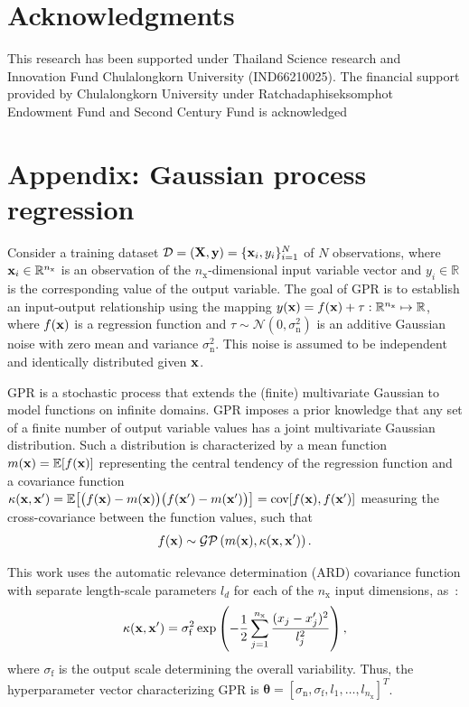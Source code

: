 \documentclass[preprint,3p]{elsarticle}
\begin{document}
\begin{linenumbers}
\section*{Acknowledgments}
This research has been supported under Thailand Science research and Innovation Fund Chulalongkorn University
(IND66210025). The financial support provided by Chulalongkorn University under Ratchadaphiseksomphot Endowment
Fund and Second Century Fund is acknowledged

\section*{Appendix: Gaussian process regression}
\label{APPE}
\setcounter{equation}{0}
\renewcommand{\theequation}{A.\arabic{equation}}
Consider a training dataset $\mathcal{D}=\left(
{\bf X},{\bf y}\right) = \{{\bf x}_i,y_i\}_{i=1}^N$ of $N$ observations, where ${\bf x}_i\in\mathbb{R}^{n_\text{x}}$ is an observation of the $n_\text{x}$-dimensional input variable vector and $y_i\in\mathbb{R}$ is the corresponding value of the output variable. 
The goal of GPR is to establish an input-output relationship using the mapping $y({\bf x}) = f({\bf x})+\tau:\mathbb{R}^{n_\text{x}} \mapsto \mathbb{R}$, where 
$f({\bf x})$ is a regression function and $\tau
\sim\mathcal{N}(0,\sigma_\text{n}^2)$ is an additive Gaussian noise with zero mean and variance $\sigma_\text{n}^2$.
This noise is assumed to be independent and identically distributed given ${\bf x}$.

GPR is a stochastic process that extends the (finite) multivariate Gaussian to model functions on infinite domains. GPR imposes a prior knowledge that any set of a finite number of output variable values has a joint multivariate Gaussian distribution. Such a distribution is characterized by a mean function $m({\bf x}) = \mathbb{E}[f({\bf x})]$ representing the central tendency of the regression function and a covariance function $\kappa({\bf x}, {\bf x}') = \mathbb{E}\big[\big(f({\bf x}) - m({\bf x})\big)\big(f({\bf x}') - m({\bf x}')\big)\big] = \text{cov}[f({\bf x}),f({\bf x}')]$ measuring the cross-covariance between the function values, such that
\begin{equation}
	f({\bf x}) \sim \mathcal{GP}\left(m({\bf x}),\kappa({ \bf x}, {\bf x}')\right).
	\label{EQ:A1}
\end{equation}

This work uses the automatic relevance determination (ARD) covariance function with separate length-scale parameters $l_d$ for each of the $n_\text{x}$ input dimensions, as~\cite{Murphy2012}:
\begin{equation}
	\kappa({\bf x},{\bf x}') = \sigma_\text{f}^2\exp\left(-\frac{1}{2}\displaystyle\sum_{j=1}^{n_\text{x}}\frac{(x_j-x_j')^2}{l_j^2}\right),
	\label{EQ:A2}
\end{equation}
where $\sigma_\text{f}$ is the output scale determining the overall variability. Thus, the hyperparameter vector characterizing GPR is $\boldsymbol{\theta} = [\sigma_\text{n},\sigma_\text{f},l_1,\dots,l_{n_\text{x}}]^T$.


\end{linenumbers}
\end{document}
